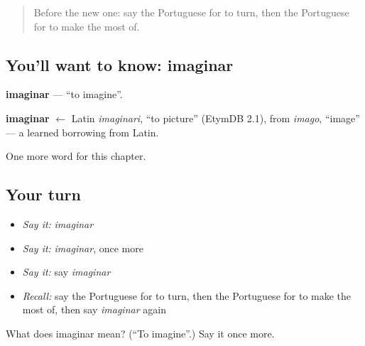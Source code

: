 \begin{quote}
Before the new one: say the Portuguese for to turn, then the Portuguese for to make the most of.
\end{quote}

\subsection*{You'll want to know: imaginar}
\textbf{imaginar} — \textquotedblleft{}to imagine\textquotedblright{}.

\begin{cousinweb}
\textbf{imaginar} $\leftarrow$ Latin \emph{imaginari}, \textquotedblleft{}to picture\textquotedblright{} (EtymDB 2.1), from \emph{imago}, \textquotedblleft{}image\textquotedblright{} — a learned borrowing from Latin.
\end{cousinweb}

\begin{grammarlens}[title={What you've built}]
One more word for this chapter.
\end{grammarlens}

\subsection*{Your turn}
\begin{itemize}
\raggedright
  \item \emph{Say it:} \emph{imaginar}
  \item \emph{Say it:} \emph{imaginar}, once more
  \item \emph{Say it:} say \emph{imaginar}
  \item \emph{Recall:} say the Portuguese for to turn, then the Portuguese for to make the most of, then say \emph{imaginar} again
\end{itemize}

\begin{tcolorbox}[breakable,colback=teal!4,colframe=teal!35!black,title={Before you move on}]
What does imaginar mean? (\textquotedblleft{}To imagine\textquotedblright{}.) Say it once more.
\end{tcolorbox}
